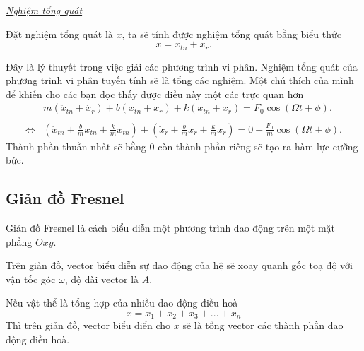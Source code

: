 \underline{\textit{Nghiệm tổng quát}}

Đặt nghiệm tổng quát là \(x\), ta sẽ tính được nghiệm tổng quát bằng biểu thức
\begin{equation}
    x = x_{tn} + x_r.
\end{equation}

Đây là lý thuyết trong việc giải các phương trình vi phân. Nghiệm tổng quát của phương trình vi phân tuyến tính sẽ là tổng các nghiệm. Một chú thích của mình để khiến cho các bạn đọc thấy được điều này một các trực quan hơn
\begin{equation*}
\begin{array}{cc}
    &m (\ddot{x}_{tn} + \ddot{x}_r) + b (\dot{x}_{tn} + \dot{x}_r) + k (x_{tn} + x_{r})  = F_0 \cos{\left(\Omega t + \phi \right)}. 
    \\
    \\
    
    \Leftrightarrow &  \left( \ddot{x}_{tn} + {\displaystyle \frac{b}{m}} \dot{x}_{tn} + {\displaystyle \frac{k}{m}} x_{tn}\right) + \left(    \ddot{x}_{r} + {\displaystyle \frac{b}{m}} \dot{x}_{r} + {\displaystyle \frac{k}{m}} x_{r} \right) = 0 +{\displaystyle \frac{F_0}{m}} \cos{\left(\Omega t + \phi \right)}.
\end{array}
\end{equation*}
Thành phần thuần nhất sẽ bằng \(0\) còn thành phần riêng sẽ tạo ra hàm lực cưỡng bức.
\subsection{Giản đồ Fresnel}
Giản đồ Fresnel là cách biểu diễn một phương trình dao động trên một mặt phẳng \(Oxy\). 
\begin{figure}[!htb]
    \centering
    
    \caption{}
    \label{fig:1.10}
\end{figure}
Trên giản đồ, vector biểu diễn sự dao động của hệ sẽ xoay quanh gốc toạ độ với vận tốc góc \(\omega\), độ dài vector là \(A\). 
\vspace{2mm}

Nếu vật thể là tổng hợp của nhiều dao động điều hoà
\begin{equation*}
    x = x_1 + x_2 + x_3 + ... + x_n
\end{equation*}
Thì trên giản đồ, vector biểu diển cho \(x\) sẽ là tổng vector các thành phần dao động điều hoà.
\begin{figure}[!htb]
    \centering
    
    \caption{}
    \label{fig:1.11}
\end{figure}
